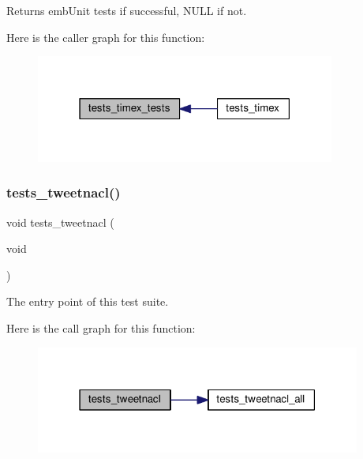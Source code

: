 \begin{DoxyReturn}{Returns}
emb\+Unit tests if successful, N\+U\+LL if not. 
\end{DoxyReturn}
Here is the caller graph for this function\+:
\nopagebreak
\begin{figure}[H]
\begin{center}
\leavevmode
\includegraphics[width=279pt]{group__unittests_ga8e6c61c50f2b2580f16effebba8a7e83_icgraph}
\end{center}
\end{figure}
\mbox{\label{group__unittests_gaa48af13c9647d85886796d6c526776a1}} 
\subsubsection{\texorpdfstring{tests\+\_\+tweetnacl()}{tests\_tweetnacl()}}
{\footnotesize\ttfamily void tests\+\_\+tweetnacl (\begin{DoxyParamCaption}\item[{void}]{ }\end{DoxyParamCaption})}



The entry point of this test suite. 

Here is the call graph for this function\+:
\nopagebreak
\begin{figure}[H]
\begin{center}
\leavevmode
\includegraphics[width=303pt]{group__unittests_gaa48af13c9647d85886796d6c526776a1_cgraph}
\end{center}
\end{figure}
\mbox{\label{group__unittests_ga9eef4348cd35bd34bac6ef153930eca1}} 
